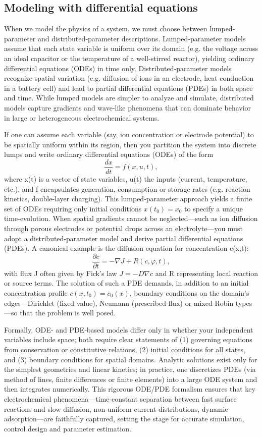 \subsection{Modeling with differential equations}
When we model the physics of a system, we must choose between lumped‐parameter and distributed‐parameter descriptions.  Lumped‐parameter models assume that each state variable is uniform over its domain (e.g. the voltage across an ideal capacitor or the temperature of a well‐stirred reactor), yielding ordinary differential equations (ODEs) in time only.  Distributed‐parameter models recognize spatial variation (e.g. diffusion of ions in an electrode, heat conduction in a battery cell) and lead to partial differential equations (PDEs) in both space and time.  While lumped models are simpler to analyze and simulate, distributed models capture gradients and wave‐like phenomena that can dominate behavior in large or heterogeneous electrochemical systems.

 If one can assume each variable (say, ion concentration or electrode potential) to be spatially uniform within its region, then you partition the system into discrete lumps and write ordinary differential equations (ODEs) of the form
$$
\frac{dx}{dt} = f(x, u, t),
$$
where x(t) is a vector of state variables, u(t) the inputs (current, temperature, etc.), and f encapsulates generation, consumption or storage rates (e.g. reaction kinetics, double‐layer charging). This lumped‐parameter approach yields a finite set of ODEs requiring only initial conditions $x(t_0)=x_0$ to specify a unique time‐evolution.
When spatial gradients cannot be neglected—such as ion diffusion through porous electrodes or potential drops across an electrolyte—you must adopt a distributed‐parameter model and derive partial differential equations (PDEs). A canonical example is the diffusion equation for concentration c(x,t):
$$
\frac{\partial c}{ \partial t} =-\nabla J + R(c,\varphi,t),
$$
with flux J often given by Fick’s law $J= -D\nabla c$ and R representing local reaction or source terms. The solution of such a PDE demands, in addition to an initial concentration profile $c(x,t_0)=c_0(x)$, boundary conditions on the domain’s edges—Dirichlet (fixed value), Neumann (prescribed flux) or mixed Robin types—so that the problem is well posed.

Formally, ODE‐ and PDE‐based models differ only in whether your independent variables include space; both require clear statements of (1) governing equations from conservation or constitutive relations, (2) initial conditions for all states, and (3) boundary conditions for spatial domains. Analytic solutions exist only for the simplest geometries and linear kinetics; in practice, one discretizes PDEs (via method of lines, finite differences or finite elements) into a large ODE system and then integrates numerically. This rigorous ODE/PDE formalism ensures that key electrochemical phenomena—time‐constant separation between fast surface reactions and slow diffusion, non‐uniform current distributions, dynamic adsorption—are faithfully captured, setting the stage for accurate simulation, control design and parameter estimation.

